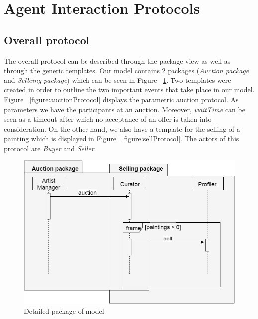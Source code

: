 \documentclass[a4paper,11pt]{report}
\begin{document}
  
  
  
  
  \section{Agent Interaction Protocols} %
  
  
  \subsection{Overall protocol} %
  The overall protocol can be described through the package view as well as
  through the generic templates. Our model contains 2 packages (\textit{Auction package}
  and \textit{Selleing package}) which can be seen in Figure ~\ref{figure:package}.
  Two templates were created in order to outline the two important events that take
  place in our model. Figure ~\ref{figure:auctionProtocol} displays the parametric auction protocol.
  As parameters we have the participants at an auction. Moreover, \textit{waitTime} can be seen
  as a timeout after which no acceptance of an offer is taken into consideration. On the 
  other hand, we also have a template for the selling of a painting which
  is displayed in Figure ~\ref{figure:sellProtocol}. The actors of this protocol are \textit{Buyer}
  and \textit{Seller}.
  
   \begin{figure}[ht!]
    \centering
    \includegraphics[width=\textwidth]{media/package.png}
    \caption{Detailed package of model}
    \label{figure:package}
   \end{figure}
\end{document}
